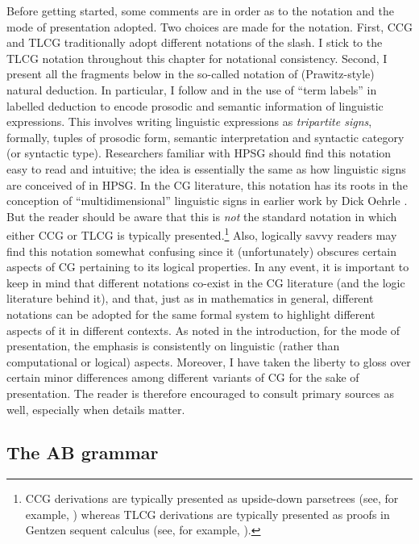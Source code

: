 \documentclass[output=paper
                ,modfonts
                ,nonflat
	        ,collection
	        ,collectionchapter
	        ,collectiontoclongg
 	        ,biblatex
                ,babelshorthands
                ,newtxmath
                ,draftmode
                ,colorlinks, citecolor=brown
]{./langsci/langscibook}
\begin{document}
Before getting started, some comments are in order as to the notation
and the mode of presentation adopted. Two choices are made for the
notation. First, CCG and TLCG traditionally adopt different notations
of the slash. I stick to the TLCG notation throughout this chapter for
notational consistency. Second, I present all the fragments below in
the so-called  notation of (Prawitz-style)
natural deduction. In particular, I follow \citet{oehrle1994} and
\citet{Morrill94a-u} in the use of ``term labels'' in labelled deduction
to encode prosodic and semantic information of linguistic expressions.
This involves writing linguistic expressions as \emph{tripartite
signs}, formally, tuples of prosodic form, semantic interpretation and
syntactic category (or syntactic type). Researchers familiar with HPSG
should find this notation easy to read and intuitive; the idea is
essentially the same as how linguistic signs are conceived of in HPSG.
In the CG literature, this notation has its roots in the conception of
``multidimensional'' linguistic signs in earlier work by Dick Oehrle
\citeyearpar{oehrle88}. But the reader should be aware that this is
\emph{not} the standard notation in which either CCG or TLCG is
typically presented.\footnote{CCG derivations are typically presented
  as upside-down parsetrees (see, for example,
  \citealt{Steedman2000a-u,steedman2012}) whereas  TLCG derivations are
  typically presented as proofs in Gentzen sequent calculus (see, for
  example, \citealt{Moortgat2011a-u,barkershan2015}).}
Also, logically savvy readers may find this
notation somewhat confusing since it (unfortunately) obscures certain
aspects of CG pertaining to its logical properties. In any event, it
is important to keep in mind that different notations co-exist in the
CG literature (and the logic literature behind it), and that, just as
in mathematics in general, different notations can be adopted for the
same formal system to highlight different aspects of it in different
contexts. As noted in the introduction,  for the mode of presentation, the emphasis is consistently
on linguistic (rather than computational or logical) aspects.
Moreover, I have taken the liberty to gloss over certain
minor differences among different variants of CG for the sake of
presentation. The reader is therefore encouraged
to consult primary sources as well, especially when details matter.


\subsection{The AB grammar \label{ab}}
\end{document}
